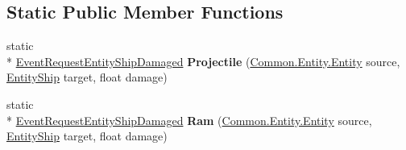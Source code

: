 \subsection*{Static Public Member Functions}
\begin{DoxyCompactItemize}
\item 
\hypertarget{class_skyrates_1_1_client_1_1_network_1_1_event_1_1_event_request_entity_ship_damaged_a2349e761091c78c246224a5b129cb69c}{static \\*
\hyperlink{class_skyrates_1_1_client_1_1_network_1_1_event_1_1_event_request_entity_ship_damaged}{Event\-Request\-Entity\-Ship\-Damaged} {\bfseries Projectile} (\hyperlink{class_skyrates_1_1_common_1_1_entity_1_1_entity}{Common.\-Entity.\-Entity} source, \hyperlink{class_skyrates_1_1_client_1_1_entity_1_1_entity_ship}{Entity\-Ship} target, float damage)}\label{class_skyrates_1_1_client_1_1_network_1_1_event_1_1_event_request_entity_ship_damaged_a2349e761091c78c246224a5b129cb69c}

\item 
\hypertarget{class_skyrates_1_1_client_1_1_network_1_1_event_1_1_event_request_entity_ship_damaged_abf0a860dbfeaf12e4f2165f4def0e438}{static \\*
\hyperlink{class_skyrates_1_1_client_1_1_network_1_1_event_1_1_event_request_entity_ship_damaged}{Event\-Request\-Entity\-Ship\-Damaged} {\bfseries Ram} (\hyperlink{class_skyrates_1_1_common_1_1_entity_1_1_entity}{Common.\-Entity.\-Entity} source, \hyperlink{class_skyrates_1_1_client_1_1_entity_1_1_entity_ship}{Entity\-Ship} target, float damage)}\label{class_skyrates_1_1_client_1_1_network_1_1_event_1_1_event_request_entity_ship_damaged_abf0a860dbfeaf12e4f2165f4def0e438}

\end{DoxyCompactItemize}
